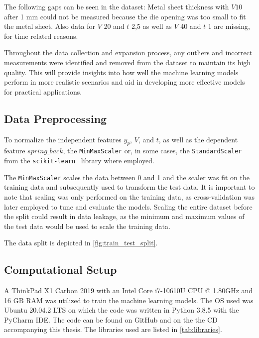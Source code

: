 {The following gaps can be seen in the dataset: Metal sheet thickness with $V10$  after 1 mm could not be measured
because the die opening was too small to fit the metal sheet.
Also data for $V$ 20 and $t$ 2,5 as well as $V$ 40 and $t$ 1 are missing, for time related reasons.

Throughout the data collection and expansion process, any outliers and incorrect measurements were identified and
removed from the dataset to maintain its high quality.
This will provide insights into how well the machine learning models perform in more realistic scenarios and aid in
developing more effective models for practical applications.

\subsection{Data Preprocessing}\label{subsec:data-preprocessing}
To normalize the independent features $y_p$, $V$, and $t$, as well as the dependent feature $spring\_back$, the
\texttt{MinMaxScaler} or, in some cases, the \texttt{StandardScaler} from the
\texttt{scikit-learn}~\cite{scikit -learn} library where employed.

The \texttt{MinMaxScaler} scales the data between 0 and 1 and the scaler was fit on the training data and
subsequently used to transform the test data.
It is important to note that scaling was only performed on the training data, as cross-validation was later employed
to tune and evaluate the models.
Scaling the entire dataset before the split could result in data leakage, as the minimum and maximum values of the
test data would be used to scale the training data.

The data split is depicted in \cref{fig:train_test_split}.

\subsection{Computational Setup}\label{subsec:computational-setup}
A ThinkPad X1 Carbon 2019 with an Intel Core i7-10610U CPU @ 1.80GHz and 16 GB RAM was utilized to train the machine
learning models.
The OS used was Ubuntu 20.04.2 LTS on which the code was written in Python 3.8.5 with the PyCharm IDE.
The code can be found on GitHub and on the the CD accompanying this thesis.
The libraries used are listed in \cref{tab:libraries}.

}
